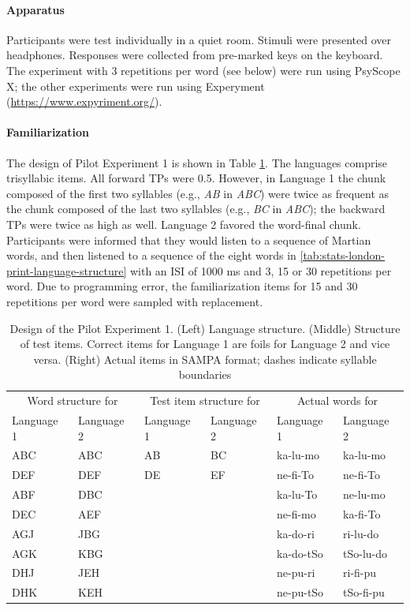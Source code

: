 \documentclass[
]{article}
\begin{document}
\hypertarget{apparatus-1}{%
\paragraph{Apparatus}\label{apparatus-1}}

Participants were test individually in a quiet room. Stimuli were
presented over headphones. Responses were collected from pre-marked keys
on the keyboard. The experiment with 3 repetitions per word (see below)
were run using PsyScope X; the other experiments were run using
Experyment (\url{https://www.expyriment.org/}).

\hypertarget{familiarization-1}{%
\paragraph{Familiarization}\label{familiarization-1}}

The design of Pilot Experiment 1 is shown in Table
\ref{tab:bcn-print-language-structure}. The languages comprise
trisyllabic items. All forward TPs were 0.5. However, in Language 1 the
chunk composed of the first two syllables (e.g., \emph{AB} in
\emph{ABC}) were twice as frequent as the chunk composed of the last two
syllables (e.g., \emph{BC} in \emph{ABC}); the backward TPs were twice
as high as well. Language 2 favored the word-final chunk. Participants
were informed that they would listen to a sequence of Martian words, and
then listened to a sequence of the eight words in
\ref{tab:stats-london-print-language-structure} with an ISI of 1000 ms
and 3, 15 or 30 repetitions per word. Due to programming error, the
familiarization items for 15 and 30 repetitions per word were sampled
with replacement.

\begin{table}

\caption{\label{tab:bcn-print-language-structure}Design of the Pilot Experiment 1. (Left) Language structure. (Middle) Structure of test items. Correct items for Language 1 are foils for Language 2 and vice versa. (Right) Actual items in SAMPA format; dashes indicate syllable boundaries}
\centering
\begin{tabular}[t]{llllll}
\toprule
\multicolumn{2}{c}{Word structure for} & \multicolumn{2}{c}{Test item structure for} & \multicolumn{2}{c}{Actual words for} \\
Language 1 & Language 2 & Language 1 & Language 2 & Language 1 & Language 2\\
\midrule
ABC & ABC & AB & BC & ka-lu-mo & ka-lu-mo\\
DEF & DEF & DE & EF & ne-fi-To & ne-fi-To\\
ABF & DBC &  &  & ka-lu-To & ne-lu-mo\\
DEC & AEF &  &  & ne-fi-mo & ka-fi-To\\
AGJ & JBG &  &  & ka-do-ri & ri-lu-do\\
\addlinespace
AGK & KBG &  &  & ka-do-tSo & tSo-lu-do\\
DHJ & JEH &  &  & ne-pu-ri & ri-fi-pu\\
DHK & KEH &  &  & ne-pu-tSo & tSo-fi-pu\\
\bottomrule
\end{tabular}
\end{table}
\end{document}
